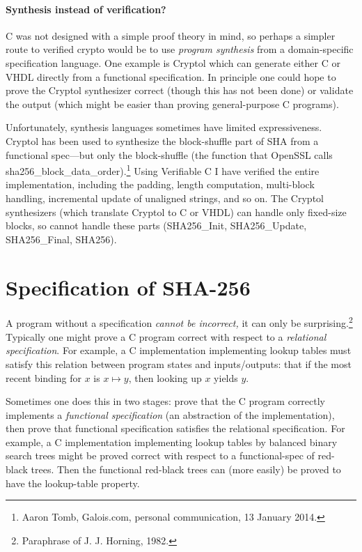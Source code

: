 \documentclass[prodmode,acmtoplas]{acmsmall}
\begin{document}
\paragraph{Synthesis instead of verification?}
C was not designed with a simple proof theory in mind,
so perhaps a simpler route to verified crypto would be
to use \emph{program synthesis} from a domain-specific
specification language.
One example is Cryptol \cite{erkok2009hardware} which can generate either C or
VHDL directly from a functional specification.
In principle one could hope to prove the Cryptol 
synthesizer correct (though this has not been done) or validate the output
(which might be easier than proving general-purpose C programs).

Unfortunately, synthesis languages 
sometimes have limited expressiveness.
Cryptol has been used to synthesize the block-shuffle part of SHA
from a functional spec---but only the block-shuffle
(the function that OpenSSL calls 
\textsf{sha256\_block\_data\_order}).\footnote{
Aaron Tomb, Galois.com, personal communication, 13 January 2014.}
Using Verifiable C I have verified the
entire implementation, including the padding, length
computation, multi-block handling, incremental update
of unaligned strings, and so on.  
The Cryptol synthesizers (which translate Cryptol to C or VHDL)
can handle only fixed-size blocks, so cannot handle these
parts (\textsf{SHA256\_Init,}
\textsf{SHA256\_Update,}
\textsf{SHA256\_Final,}
\textsf{SHA256}).

\section{Specification of SHA-256}
\label{functional-spec}

A program without a specification \emph{cannot be incorrect,} it can
only be surprising.\footnote{Paraphrase of J. J. Horning, 1982.}
Typically one might prove a C program correct with respect
to a \emph{relational specification}.
For example, a C implementation implementing lookup tables
must satisfy this relation between program states
and inputs/outputs:
that if the most recent binding for $x$ is
$x\mapsto y$, then looking up $x$ yields $y$.

Sometimes one does this in two stages:
prove that the C program correctly
implements a \emph{functional specification}
(an abstraction of the implementation),
then prove that functional specification
satisfies the relational specification.
For example, a C implementation implementing lookup tables by balanced
binary search trees might be proved correct with respect to a
functional-spec of red-black trees.  
Then the functional red-black trees can (more easily)
be proved to have the lookup-table property.
\end{document}
